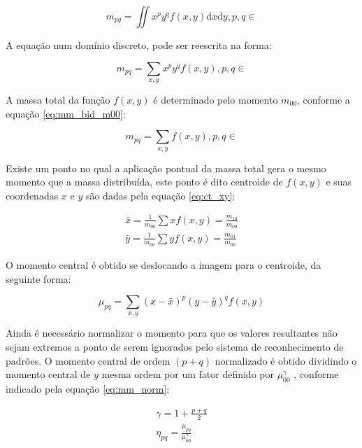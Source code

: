 \begin{equation}\label{eq:mm_bid_cont}
m_{pq} = \iint x^p y^q f(x, y) \mathrm{d}x \mathrm{d}y, p, q \in
\end{equation}

A equação num domínio discreto, pode ser reescrita na forma:

\begin{equation}\label{eq:mm_bid_disc}
m_{pq} = \sum_{x, y} x^p y^q f(x, y), p, q \in
\end{equation}

A massa total da função $ f(x, y) $ é determinado pelo
momento $ m_{00} $, conforme a equação \ref{eq:mm_bid_m00}:

\begin{equation}\label{eq:mm_bid_m00}
m_{pq} = \sum_{x, y} f(x, y), p, q \in
\end{equation}

Existe um ponto no qual a aplicação pontual da massa total gera o mesmo momento
que a massa distribuída, este ponto é dito centroide de $ f(x, y) $ e suas
coordenadas $ x $ e $ y $ são dadas pela equação \ref{eq:ct_xy}:

\begin{subequations}\label{eq:ct_xy}
\begin{align}
    \bar{x} = \frac{1}{ m_{00} } \sum x f(x, y) = \frac{ m_{10} }{ m_{00} } \\
    \bar{y} = \frac{1}{ m_{00} } \sum y f(x, y) = \frac{ m_{01} }{ m_{00} }
\end{align}
\end{subequations}

O momento central é obtido se deslocando a imagem para o centroide,
da seguinte forma:

\begin{equation}\label{eq:mm_ctr}
\mu_{pq} = \sum_{x, y} (x - \bar{x})^p (y - \bar{y})^q f(x, y)
\end{equation}

Ainda é necessário normalizar o momento para que os valores resultantes não sejam
extremos a ponto de serem ignorados pelo sistema de reconhecimento de padrões. O
momento central de ordem $ (p+q) $ normalizado é obtido dividindo o momento
central de $ y $ mesma ordem por um fator definido por $ \mu_{00}^\gamma $ ,
conforme indicado pela equação \ref{eq:mm_norm}:

\begin{subequations}\label{eq:mm_norm}
\begin{align}
    \gamma = 1 + \frac{ p + q }{2} \\
    \eta_{pq} = \frac{ \mu_{pq} }{ \mu_{00}^\gamma }
\end{align}
\end{subequations}


